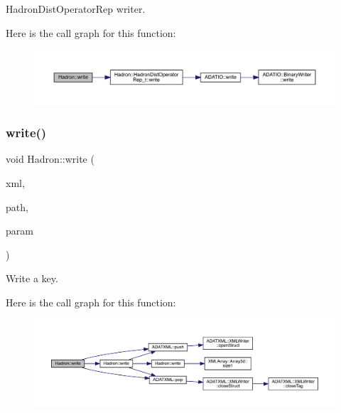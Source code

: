 Hadron\+Dist\+Operator\+Rep writer. 

Here is the call graph for this function\+:
\nopagebreak
\begin{figure}[H]
\begin{center}
\leavevmode
\includegraphics[width=350pt]{d1/daf/namespaceHadron_a9edaeb80eb507096c7529be211efa667_cgraph}
\end{center}
\end{figure}
\mbox{\label{namespaceHadron_aa1f03b8b2d78349da848f9a9bcf19e33}} 
\subsubsection{\texorpdfstring{write()}{write()}\hspace{0.1cm}{\footnotesize\ttfamily [92/95]}}
{\footnotesize\ttfamily void Hadron\+::write (\begin{DoxyParamCaption}\item[{\mbox{\hyperlink{classADATXML_1_1XMLWriter}{X\+M\+L\+Writer}} \&}]{xml,  }\item[{const std\+::string \&}]{path,  }\item[{const \mbox{\hyperlink{structHadron_1_1SingleHadronQuarkFlavor__t}{Single\+Hadron\+Quark\+Flavor\+\_\+t}} \&}]{param }\end{DoxyParamCaption})}



Write a key. 

Here is the call graph for this function\+:
\nopagebreak
\begin{figure}[H]
\begin{center}
\leavevmode
\includegraphics[width=350pt]{d1/daf/namespaceHadron_aa1f03b8b2d78349da848f9a9bcf19e33_cgraph}
\end{center}
\end{figure}
\mbox{\label{namespaceHadron_a2994f8fc2ad609574b948b8671232dd8}} 
